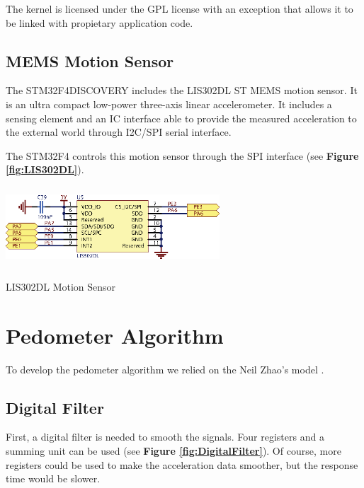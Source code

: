 \documentclass[a4paper,10pt]{article}
\makeatletter
\newenvironment{figurehere}{\def\@captype{figure}\vspace{2ex}}{\vspace{2ex}}
\makeatother
\begin{document}
\begin{multicols}{2}
The kernel is licensed under the GPL license with an exception that allows it to be linked with propietary application code.

\subsection{MEMS Motion Sensor}

The STM32F4DISCOVERY includes the LIS302DL ST MEMS motion sensor.
It is an ultra compact low-power three-axis linear accelerometer. It includes
a sensing element and an IC interface able to provide the measured acceleration
to the external world through I2C/SPI serial interface.

The STM32F4 controls this motion sensor through the SPI interface (see {\bf Figure
\ref{fig:LIS302DL}}). 

\begin{figurehere}
 \centering
 \includegraphics[width=8cm, height=3cm]{./eps/LIS302DL.eps}
 \caption{LIS302DL Motion Sensor}
 \label{fig:LIS302DL}
\end{figurehere}

\section{Pedometer Algorithm}

To develop the pedometer algorithm we relied on the Neil Zhao's model .\cite{NeilZhao}


\subsection{Digital Filter}

First, a digital filter is needed to smooth the signals. Four registers and a summing unit can be used  (see {\bf Figure
\ref{fig:DigitalFilter}}).  Of course, more registers could be used to make the acceleration data smoother, but the response time would be slower.


\end{multicols}
\end{document}
